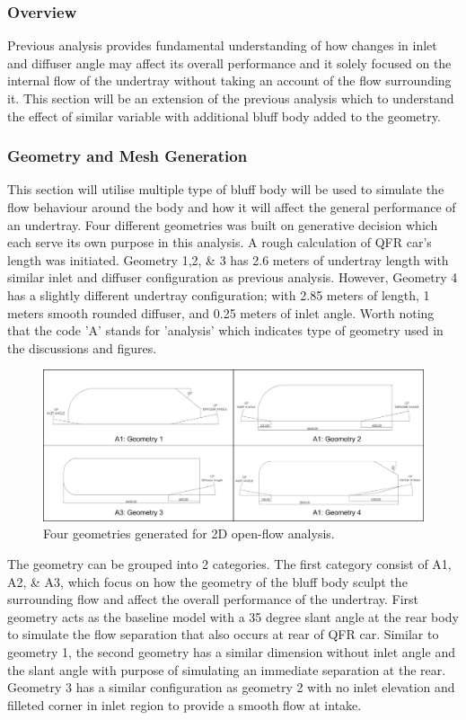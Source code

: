 \subsubsection{Overview}
Previous analysis provides fundamental understanding of how changes in inlet and diffuser angle may affect its overall performance and it solely focused on the internal flow of the undertray without taking an account of the flow surrounding it. This section will be an extension of the previous analysis which to understand the effect of similar variable with additional bluff body added to the geometry. 

\subsubsection{Geometry and Mesh Generation}
This section will utilise multiple type of bluff body will be used to simulate the flow behaviour around the body and how it will affect the general performance of an undertray. Four different geometries was built on generative decision which each serve its own purpose in this analysis. A rough calculation of QFR car's length was initiated. Geometry 1,2, \& 3 has 2.6 meters of undertray length with similar inlet and diffuser configuration as previous analysis. However, Geometry 4 has a slightly different undertray configuration; with 2.85 meters of length, 1 meters smooth rounded diffuser, and 0.25 meters of inlet angle. Worth noting that the code 'A' stands for 'analysis' which indicates type of geometry used in the discussions and figures.

\begin{figure}[!ht]
    \centering
    \includegraphics[scale = 0.58]{Figures/2D_OF/2D_OF_GEOM.png}
    \caption{Four geometries generated for 2D open-flow analysis.}
    \label{fig:2D_OF_GEOM}
\end{figure}
\noindent The geometry can be grouped into 2 categories. The first category consist of A1, A2, \& A3, which focus on how the geometry of the bluff body sculpt the surrounding flow and affect the overall performance of the undertray. First geometry acts as the baseline model with a 35 degree slant angle at the rear body to simulate the flow separation that also occurs at rear of QFR car. Similar to geometry 1, the second geometry has a similar dimension without inlet angle and the slant angle with purpose of simulating an immediate separation at the rear. Geometry 3 has a similar configuration as geometry 2 with no inlet elevation and filleted corner in inlet region to provide a smooth flow at intake.

